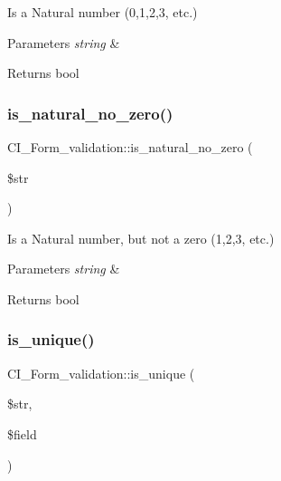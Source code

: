 Is a Natural number (0,1,2,3, etc.)


\begin{DoxyParams}{Parameters}
{\em string} & \\
\hline
\end{DoxyParams}
\begin{DoxyReturn}{Returns}
bool 
\end{DoxyReturn}
\mbox{\label{class_c_i___form__validation_aa5fc2c096f3bbe26bcef2c854aa26a04}} 
\subsubsection{\texorpdfstring{is\+\_\+natural\+\_\+no\+\_\+zero()}{is\_natural\_no\_zero()}}
{\footnotesize\ttfamily C\+I\+\_\+\+Form\+\_\+validation\+::is\+\_\+natural\+\_\+no\+\_\+zero (\begin{DoxyParamCaption}\item[{}]{\$str }\end{DoxyParamCaption})}

Is a Natural number, but not a zero (1,2,3, etc.)


\begin{DoxyParams}{Parameters}
{\em string} & \\
\hline
\end{DoxyParams}
\begin{DoxyReturn}{Returns}
bool 
\end{DoxyReturn}
\mbox{\label{class_c_i___form__validation_a7f0fbd8cde50c2d92f7e71fc628a06c3}} 
\subsubsection{\texorpdfstring{is\+\_\+unique()}{is\_unique()}}
{\footnotesize\ttfamily C\+I\+\_\+\+Form\+\_\+validation\+::is\+\_\+unique (\begin{DoxyParamCaption}\item[{}]{\$str,  }\item[{}]{\$field }\end{DoxyParamCaption})}

